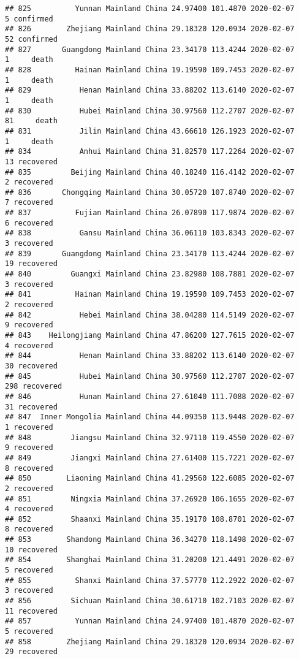 \documentclass[
]{article}
\begin{document}
\begin{verbatim}
## 825          Yunnan Mainland China 24.97400 101.4870 2020-02-07     5 confirmed
## 826        Zhejiang Mainland China 29.18320 120.0934 2020-02-07    52 confirmed
## 827       Guangdong Mainland China 23.34170 113.4244 2020-02-07     1     death
## 828          Hainan Mainland China 19.19590 109.7453 2020-02-07     1     death
## 829           Henan Mainland China 33.88202 113.6140 2020-02-07     1     death
## 830           Hubei Mainland China 30.97560 112.2707 2020-02-07    81     death
## 831           Jilin Mainland China 43.66610 126.1923 2020-02-07     1     death
## 834           Anhui Mainland China 31.82570 117.2264 2020-02-07    13 recovered
## 835         Beijing Mainland China 40.18240 116.4142 2020-02-07     2 recovered
## 836       Chongqing Mainland China 30.05720 107.8740 2020-02-07     7 recovered
## 837          Fujian Mainland China 26.07890 117.9874 2020-02-07     6 recovered
## 838           Gansu Mainland China 36.06110 103.8343 2020-02-07     3 recovered
## 839       Guangdong Mainland China 23.34170 113.4244 2020-02-07    19 recovered
## 840         Guangxi Mainland China 23.82980 108.7881 2020-02-07     3 recovered
## 841          Hainan Mainland China 19.19590 109.7453 2020-02-07     2 recovered
## 842           Hebei Mainland China 38.04280 114.5149 2020-02-07     9 recovered
## 843    Heilongjiang Mainland China 47.86200 127.7615 2020-02-07     4 recovered
## 844           Henan Mainland China 33.88202 113.6140 2020-02-07    30 recovered
## 845           Hubei Mainland China 30.97560 112.2707 2020-02-07   298 recovered
## 846           Hunan Mainland China 27.61040 111.7088 2020-02-07    31 recovered
## 847  Inner Mongolia Mainland China 44.09350 113.9448 2020-02-07     1 recovered
## 848         Jiangsu Mainland China 32.97110 119.4550 2020-02-07     9 recovered
## 849         Jiangxi Mainland China 27.61400 115.7221 2020-02-07     8 recovered
## 850        Liaoning Mainland China 41.29560 122.6085 2020-02-07     2 recovered
## 851         Ningxia Mainland China 37.26920 106.1655 2020-02-07     4 recovered
## 852         Shaanxi Mainland China 35.19170 108.8701 2020-02-07     8 recovered
## 853        Shandong Mainland China 36.34270 118.1498 2020-02-07    10 recovered
## 854        Shanghai Mainland China 31.20200 121.4491 2020-02-07     5 recovered
## 855          Shanxi Mainland China 37.57770 112.2922 2020-02-07     3 recovered
## 856         Sichuan Mainland China 30.61710 102.7103 2020-02-07    11 recovered
## 857          Yunnan Mainland China 24.97400 101.4870 2020-02-07     5 recovered
## 858        Zhejiang Mainland China 29.18320 120.0934 2020-02-07    29 recovered

\end{verbatim}
\end{document}
